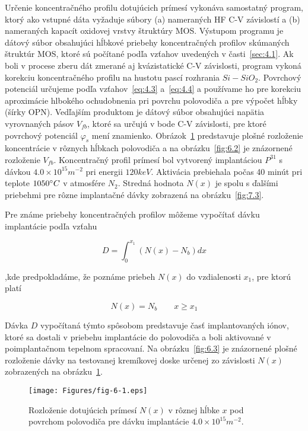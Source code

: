 Určenie koncentračného profilu dotujúcich prímesí vykonáva samostatný
program, ktorý ako vstupné dáta vyžaduje súbory (a) nameraných HF C-V
závislostí a (b) nameraných kapacít oxidovej vrstvy štruktúry
MOS\@. Výstupom programu je dátový súbor obsahujúci hĺbkové priebehy
koncentračných profilov skúmaných štruktúr MOS, ktoré sú počítané
podľa vzťahov uvedených v časti~\ref{sec:4.1}. Ak boli v procese zberu
dát zmerané aj kvázistatické C-V závislosti, program vykoná korekciu
koncentračného profilu na hustotu pascí rozhrania
$Si-SiO_2$. Povrchový potenciál určujeme podľa vzťahov~\ref{eq:4.3}
a~\ref{eq:4.4} a používame ho pre korekciu aproximácie hlbokého
ochudobnenia pri povrchu polovodiča a pre výpočet hĺbky (šírky
OPN). Vedľajším produktom je dátový súbor obsahujúci napätia
vyrovnaných pásov $V_{fb}$, ktoré sa určujú v bode C-V závislosti, pre
ktoré povrchový potenciál $\varphi_s$ mení
znamienko. Obrázok~\ref{fig:6.1} predstavuje plošné rozloženie
koncentrácie v rôznych hĺbkach polovodiča a na obrázku~\ref{fig:6.2}
je znázornené rozloženie $V_{fb}$. Koncentračný profil prímesí bol
vytvorený implantáciou $P^{31}$ s dávkou $4.0 \times 10^{15} m^{-2}$
pri energii $120 keV$. Aktivácia prebiehala počas 40 minút pri teplote
$1050 \degree C$ v atmosfére $N_2$. Stredná hodnota $N(x)$ je spolu s
ďalšími priebehmi pre rôzne implantačné dávky zobrazená na
obrázku~\ref{fig:7.3}.

Pre známe priebehy koncentračných profilov môžeme vypočítať dávku
implantácie podľa vzťahu

\begin{equation}\label{eq:6.1}
  D = \int_{0}^{x_{1}}(N(x) - N_{b}) dx
\end{equation}

,kde predpokladáme, že poznáme priebeh $N(x)$ do vzdialenosti $x_{1}$,
pre ktorú platí

\begin{equation}\label{eq:6.2}
  N(x) = N_{b} \qquad {x \ge x_{1}}
\end{equation}

Dávka $D$ vypočítaná týmto spôsobom predstavuje časť implantovaných
iónov, ktoré sa dostali v priebehu implantácie do polovodiča a boli
aktivované v poimplantačnom tepelnom spracovaní. Na
obrázku~\ref{fig:6.3} je znázornené plošné rozloženie dávky na
testovanej kremíkovej doske určenej zo závislosti $N(x)$ zobrazených
na obrázku~\ref{fig:6.1}.

\begin{figure}[h!]\centering
  \texttt{[image: Figures/fig-6-1.eps]}%
  \caption[Rozloženie dotujúcich prímesí $N(x)$ v rôznej hĺbke
    $x$]{Rozloženie dotujúcich prímesí $N(x)$ v rôznej hĺbke $x$ pod
    povrchom polovodiča pre dávku implantácie $4.0 \times
    10^{15}m^{-2}$.}\label{fig:6.1}
\end{figure}

